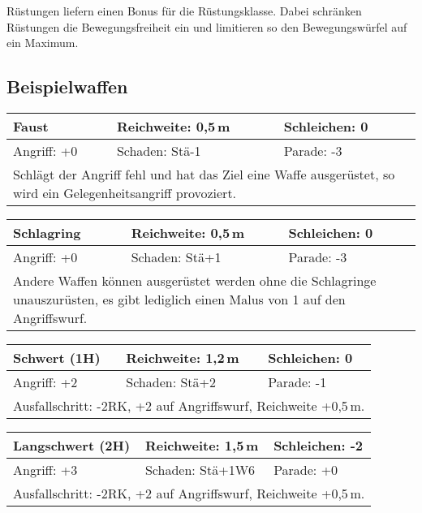\documentclass[../../Heldenanleitung2]{subfiles}
\begin{document}
Rüstungen liefern einen Bonus für die Rüstungsklasse. Dabei schränken Rüstungen die Bewegungsfreiheit ein und limitieren so den Bewegungswürfel auf ein Maximum.

\subsection{Beispielwaffen}

\begin{tabular}{|p{}|p{}|p{}|}
\hline
\textbf{Faust} & Reichweite: 0,5\,m & Schleichen: 0 \\
\hline
Angriff: +0 & Schaden: Stä-1 & Parade: -3\\
\hline
\multicolumn{3}{|p{0.99\textwidth}|}{Schlägt der Angriff fehl und hat das Ziel eine Waffe ausgerüstet, so wird ein Gelegenheitsangriff provoziert.} \\
\hline
\end{tabular}
\newline \newline\newline
\begin{tabular}{|p{}|p{}|p{}|}
\hline
\textbf{Schlagring} & Reichweite: 0,5\,m & Schleichen: 0\\
\hline
Angriff: +0 & Schaden: Stä+1 & Parade: -3 \\
\hline
\multicolumn{3}{|p{0.99\textwidth}|}{Andere Waffen können ausgerüstet werden ohne die Schlagringe unauszurüsten, es gibt lediglich einen Malus von 1 auf den Angriffswurf.} \\
\hline
\end{tabular}
\newline \newline\newline
\begin{tabular}{|p{}|p{}|p{}|}
\hline
\textbf{Schwert (1H)} & Reichweite: 1,2\,m & Schleichen: 0\\
\hline
Angriff: +2 & Schaden: Stä+2 & Parade: -1\\
\hline
\multicolumn{3}{|p{0.99\textwidth}|}{Ausfallschritt: -2RK, +2 auf Angriffswurf, Reichweite +0,5\,m.} \\
\hline
\end{tabular}
\newline \newline\newline
\begin{tabular}{|p{}|p{}|p{}|}
\hline
\textbf{Langschwert (2H)} & Reichweite: 1,5\,m & Schleichen: -2 \\
\hline
Angriff: +3 & Schaden: Stä+1W6 & Parade: +0\\
\hline
\multicolumn{3}{|p{0.99\textwidth}|}{Ausfallschritt: -2RK, +2 auf Angriffswurf, Reichweite +0,5\,m.} \\
\hline
\end{tabular}
\end{document}
